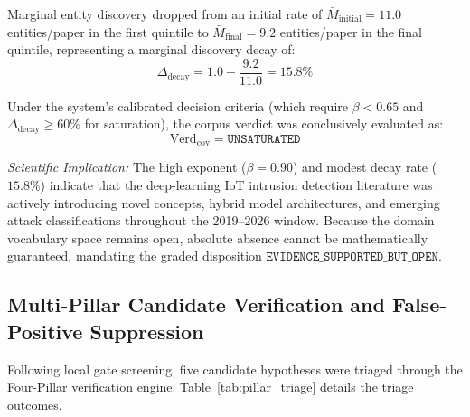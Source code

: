 \documentclass[conference,10pt]{IEEEtran}
\begin{document}
Marginal entity discovery dropped from an initial rate of $\bar{M}_{\text{initial}} = 11.0$ entities/paper in the first quintile to $\bar{M}_{\text{final}} = 9.2$ entities/paper in the final quintile, representing a marginal discovery decay of:
\begin{equation}
\Delta_{\text{decay}} = 1.0 - \frac{9.2}{11.0} = 15.8\%
\end{equation}

Under the system's calibrated decision criteria (which require $\beta < 0.65$ and $\Delta_{\text{decay}} \ge 60\%$ for saturation), the corpus verdict was conclusively evaluated as:
\begin{equation}
\mathrm{Verd}_{\text{cov}} = \texttt{UNSATURATED}
\end{equation}

\emph{Scientific Implication:} The high exponent ($\beta = 0.90$) and modest decay rate ($15.8\%$) indicate that the deep-learning IoT intrusion detection literature was actively introducing novel concepts, hybrid model architectures, and emerging attack classifications throughout the 2019--2026 window. Because the domain vocabulary space remains open, absolute absence cannot be mathematically guaranteed, mandating the graded disposition $\texttt{EVIDENCE\_SUPPORTED\_BUT\_OPEN}$.

\subsection{Multi-Pillar Candidate Verification and False-Positive Suppression}
Following local gate screening, five candidate hypotheses were triaged through the Four-Pillar verification engine. Table~\ref{tab:pillar_triage} details the triage outcomes.
\end{document}
